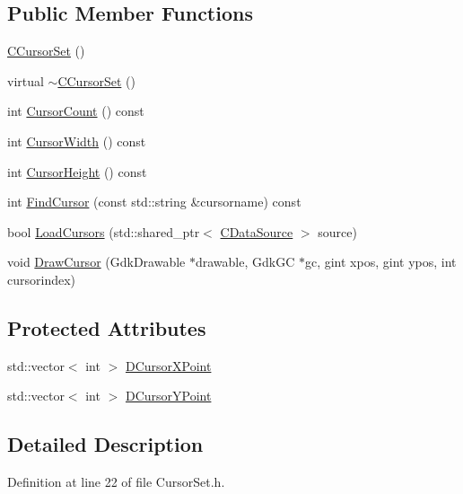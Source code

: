 \subsection*{Public Member Functions}
\begin{DoxyCompactItemize}
\item 
\hyperlink{classCCursorSet_af7040d50fde2f260b3d95c42312b1cc9}{C\+Cursor\+Set} ()
\item 
virtual \hyperlink{classCCursorSet_ae8783829a637263e44fc6dff799c5e0e}{$\sim$\+C\+Cursor\+Set} ()
\item 
int \hyperlink{classCCursorSet_ad42c2ad37c03f39fa4b84aa362b337e6}{Cursor\+Count} () const
\item 
int \hyperlink{classCCursorSet_a6984a5bfd8b989c09f9ab8aac459993e}{Cursor\+Width} () const
\item 
int \hyperlink{classCCursorSet_a25ce1f3e861c3d4ea701bb2e810728a6}{Cursor\+Height} () const
\item 
int \hyperlink{classCCursorSet_a6a7ee8b41e6de490a7817b3f3ce5fb9f}{Find\+Cursor} (const std\+::string \&cursorname) const
\item 
bool \hyperlink{classCCursorSet_abde01bde36a926de4d2de67e48be0cc0}{Load\+Cursors} (std\+::shared\+\_\+ptr$<$ \hyperlink{classCDataSource}{C\+Data\+Source} $>$ source)
\item 
void \hyperlink{classCCursorSet_ab28cc2871e723b2509a5036eac1086ba}{Draw\+Cursor} (Gdk\+Drawable $\ast$drawable, Gdk\+GC $\ast$gc, gint xpos, gint ypos, int cursorindex)
\end{DoxyCompactItemize}
\subsection*{Protected Attributes}
\begin{DoxyCompactItemize}
\item 
std\+::vector$<$ int $>$ \hyperlink{classCCursorSet_af36d1812e93362f15553c63876f2045b}{D\+Cursor\+X\+Point}
\item 
std\+::vector$<$ int $>$ \hyperlink{classCCursorSet_a581192f0e4414acce8b1da7f24ea1b98}{D\+Cursor\+Y\+Point}
\end{DoxyCompactItemize}


\subsection{Detailed Description}


Definition at line 22 of file Cursor\+Set.\+h.



